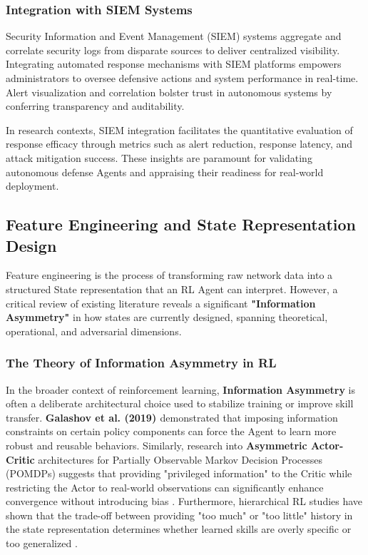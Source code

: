 \documentclass[12pt,a4paper]{report}
\begin{document}
\subsubsection*{Integration with SIEM Systems}

Security Information and Event Management (SIEM) systems aggregate and correlate security logs from disparate sources to deliver centralized visibility. Integrating automated response mechanisms with SIEM platforms empowers administrators to oversee defensive actions and system performance in real-time. Alert visualization and correlation bolster trust in autonomous systems by conferring transparency and auditability.

In research contexts, SIEM integration facilitates the quantitative evaluation of response efficacy through metrics such as alert reduction, response latency, and attack mitigation success. These insights are paramount for validating autonomous defense Agents and appraising their readiness for real-world deployment.

\subsection{Feature Engineering and State Representation Design}

Feature engineering is the process of transforming raw network data into a structured State representation that an RL Agent can interpret. However, a critical review of existing literature reveals a significant \textbf{"Information Asymmetry"} in how states are currently designed, spanning theoretical, operational, and adversarial dimensions.

\subsubsection*{The Theory of Information Asymmetry in RL}

In the broader context of reinforcement learning, \textbf{Information Asymmetry} is often a deliberate architectural choice used to stabilize training or improve skill transfer. \textbf{Galashov et al. (2019) \cite{galashov2019information}} demonstrated that imposing information constraints on certain policy components can force the Agent to learn more robust and reusable behaviors. Similarly, research into \textbf{Asymmetric Actor-Critic} architectures for Partially Observable Markov Decision Processes (POMDPs) suggests that providing "privileged information" to the Critic while restricting the Actor to real-world observations can significantly enhance convergence without introducing bias \cite{kaelbling2021informed}. Furthermore, hierarchical RL studies have shown that the trade-off between providing "too much" or "too little" history in the state representation determines whether learned skills are overly specific or too generalized \cite{merel2022priors}.
\end{document}
